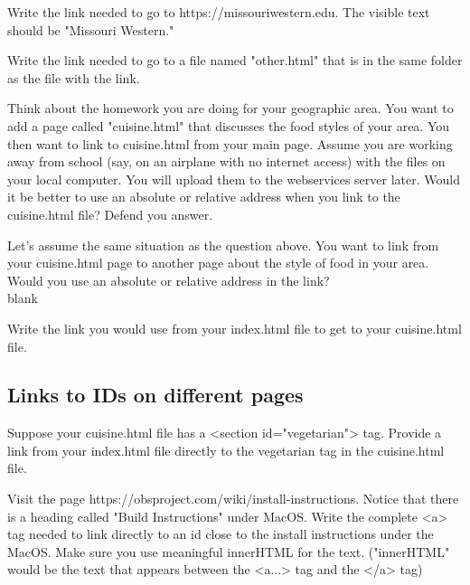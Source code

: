 \documentclass[letterpaper,12pt]{exam}
\begin{document}
\begin{questions}
\question Write the link needed to go to https://missouriwestern.edu.  The visible text should be "Missouri Western." 
\vspace{10mm}

\question Write the link needed to go to a file named "other.html" that is in the same folder as the file with the link. 
\vspace{10mm}

\question Think about the homework you are doing for your geographic area.  You want to add a page called "cuisine.html" 
that discusses the food styles of your area.  You then want to link to cuisine.html from your main page.  Assume you are working away from school (say, on an airplane with no internet access) with the files on your local computer.  You will upload them to the webservices server later. 
Would it be better to use an absolute or relative address when you link to the cuisine.html file?  Defend you answer.
\vspace{15mm}

\question Let's assume the same situation as the question above.  You want to link from your cuisine.html page to another page about the style of food in your area.  Would you use an absolute or relative address in the link? \\blank\blank 
\vspace{2mm}

\question Write the link you would use from your index.html file to get to your cuisine.html file.
\vspace{10mm}

\begin{samepage}
\subsection*{Links to IDs on different pages}

\question Suppose your cuisine.html file has a <section id="vegetarian"> tag.  Provide a link from your index.html file directly to the vegetarian tag in the cuisine.html file. 
\vspace{10mm}
\end{samepage}

\question Visit the page https://obsproject.com/wiki/install-instructions.  Notice that there is a heading called "Build Instructions" under MacOS.  
Write the complete <a> tag needed to link directly to an id close to the install instructions under the MacOS.  Make sure you use meaningful innerHTML for the text. ("innerHTML" would be the text that appears between the <a...> tag and the </a> tag)
\vspace{10mm}


\end{questions}
\end{document}
